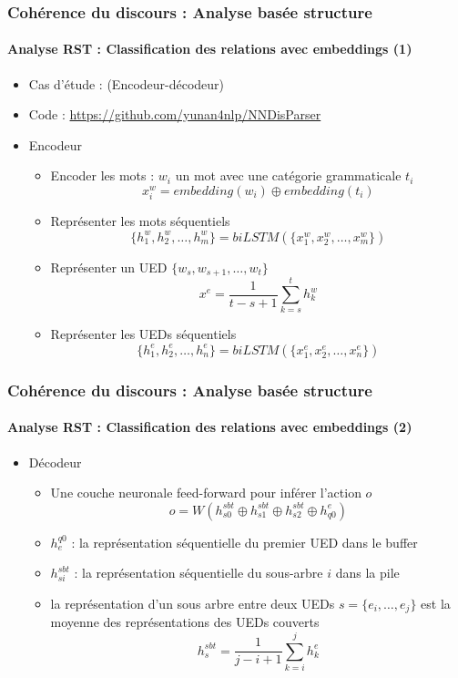\documentclass[xcolor=table]{beamer}
\begin{document}
\begin{frame}
	\frametitle{Cohérence du discours : Analyse basée structure}
	\framesubtitle{Analyse RST : Classification des relations avec embeddings (1)}
	
	\begin{itemize}
		\item Cas d'étude : \cite{2018-yu-al} (Encodeur-décodeur)
		\item Code : \url{https://github.com/yunan4nlp/NNDisParser}
		\item Encodeur 
		\begin{itemize}
			\item Encoder les mots : $ w_i $ un mot avec une catégorie grammaticale $t_i$
			\[x_i^w = embedding(w_i) \oplus embedding(t_i)\]
			\item Représenter les mots séquentiels
			\[ \{h_1^w, h_2^w, \ldots, h_m^w \} = biLSTM(\{x_1^w, x_2^w, \ldots, x_m^w \})\]
			\item Représenter un UED $\{w_s, w_{s+1}, \ldots, w_t \}$
			\[ x^e = \frac{1}{t-s+1} \sum_{k=s}^{t} h_k^w\]
			\item Représenter les UEDs séquentiels
			\[ \{h_1^e, h_2^e, \ldots, h_n^e \} = biLSTM(\{x_1^e, x_2^e, \ldots, x_n^e \})\]
		\end{itemize}
	\end{itemize}
	
\end{frame}

\begin{frame}
	\frametitle{Cohérence du discours : Analyse basée structure}
	\framesubtitle{Analyse RST : Classification des relations avec embeddings (2)}
	
	\begin{itemize}
		\item Décodeur 
		\begin{itemize}
			\item Une couche neuronale feed-forward pour inférer l'action $o$
			\[o = W(h_{s0}^{sbt} \oplus h_{s1}^{sbt} \oplus h_{s2}^{sbt} \oplus h_{q0}^{e})\]
			\item $ h_{e}^{q0} $ : la représentation séquentielle du premier UED dans le buffer
			\item $h_{si}^{sbt}$ : la représentation séquentielle du sous-arbre $i$ dans la pile
			\item la représentation d'un sous arbre entre deux UEDs $ s= \{e_i, \ldots, e_j\}$ est la moyenne des représentations des UEDs couverts
			\[ h_{s}^{sbt} = \frac{1}{j-i+1} \sum_{k=i}^{j} h_k^e\]
		\end{itemize}
	\end{itemize}
	
\end{frame}
\end{document}
